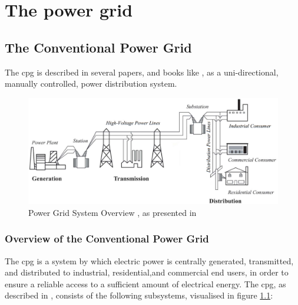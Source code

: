  



\chapter{The power grid}






\section{The Conventional Power Grid}
The \acrfull{cpg} is described in several papers, and books like \cite{BlumeStevenW2007Epsb}, as  a uni-directional, manually controlled, power distribution system.  

\begin{figure}[t]
\includegraphics[width=\linewidth]{figures/Blume-PowerGrid-SystemOverView.eps}
\caption[Power Grid System Overview]{Power Grid System Overview , as presented in \cite{BlumeStevenW2007Epsb}}
\label{fig:Blume-PowerGrid-SystemOverView}
\end{figure}



\subsection{Overview of the Conventional Power Grid}
The \acrlong{cpg} is a system by which electric power is centrally generated, transmitted, and distributed to industrial, residential,and commercial end users, in order to ensure a reliable access to a sufficient amount of electrical energy. 
  The \acrlong{cpg}, as described in \cite{BlumeStevenW2007Epsb}, consists of the following subsystems, visualised in figure \ref{fig:Blume-PowerGrid-SystemOverView}:

